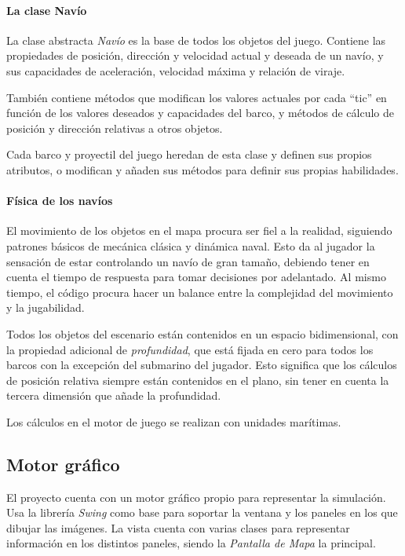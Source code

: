 \documentclass[a4paper,
	11pt,
	parskip=full,
	bibliography=totoc,
	twoside
	]{scrartcl}
\begin{document}
		\paragraph{La clase Navío}
			La clase abstracta \textit{Navío} es la base de todos los objetos del juego. Contiene las propiedades de posición, dirección y velocidad actual y deseada de un navío, y sus capacidades de aceleración, velocidad máxima y relación de viraje.
			
			También contiene métodos que modifican los valores actuales por cada ``tic'' en función de los valores deseados y capacidades del barco, y métodos de cálculo de posición y dirección relativas a otros objetos.
			
			Cada barco y proyectil del juego heredan de esta clase y definen sus propios atributos, o modifican y añaden sus métodos para definir sus propias habilidades.
			
		\paragraph{Física de los navíos}
			El movimiento de los objetos en el mapa procura ser fiel a la realidad, siguiendo patrones básicos de mecánica clásica y dinámica naval. Esto da al jugador la sensación de estar controlando un navío de gran tamaño, debiendo tener en cuenta el tiempo de respuesta para tomar decisiones por adelantado. Al mismo tiempo, el código procura hacer un balance entre la complejidad del movimiento y la jugabilidad.
			
			Todos los objetos del escenario están contenidos en un espacio bidimensional, con la propiedad adicional de \textit{profundidad}, que está fijada en cero para todos los barcos con la excepción del submarino del jugador. Esto significa que los cálculos de posición relativa siempre están contenidos en el plano, sin tener en cuenta la tercera dimensión que añade la profundidad.
			
			Los cálculos en el motor de juego se realizan con unidades marítimas.
	
	\subsection{Motor gráfico}
	\label{subsec:motor_grafico}
		El proyecto cuenta con un motor gráfico propio para representar la simulación. Usa la librería \textit{Swing} como base para soportar la ventana y los paneles en los que dibujar las imágenes. La vista cuenta con varias clases para representar información en los distintos paneles, siendo la \textit{Pantalla de Mapa} la principal.
		
\end{document}
